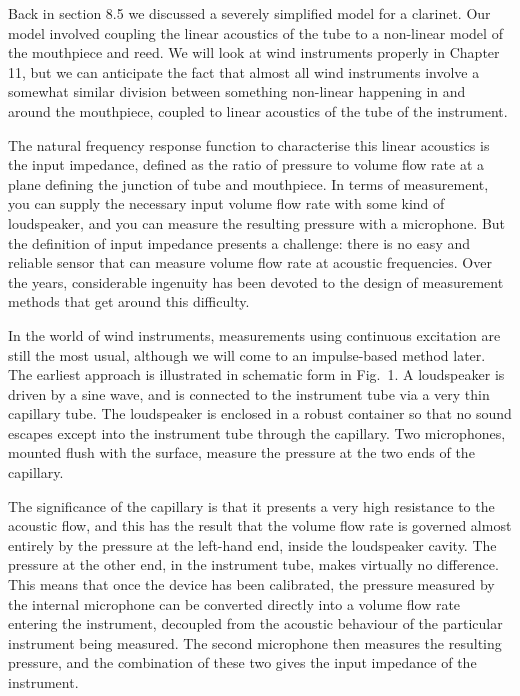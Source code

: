   Back in section 8.5 we discussed a severely simplified model for a clarinet. 
  Our model involved coupling the linear acoustics of the tube to a non-linear 
  model of the mouthpiece and reed. We will look at wind instruments properly 
  in Chapter 11, but we can anticipate the fact that almost all wind 
  instruments involve a somewhat similar division between something non-linear 
  happening in and around the mouthpiece, coupled to linear acoustics of the 
  tube of the instrument. 

  The natural frequency response function to characterise this linear acoustics 
  is the input impedance, defined as the ratio of pressure to volume flow rate 
  at a plane defining the junction of tube and mouthpiece. In terms of 
  measurement, you can supply the necessary input volume flow rate with some 
  kind of loudspeaker, and you can measure the resulting pressure with a 
  microphone. But the definition of input impedance presents a challenge: there 
  is no easy and reliable sensor that can measure volume flow rate at acoustic 
  frequencies. Over the years, considerable ingenuity has been devoted to the 
  design of measurement methods that get around this difficulty. 

  In the world of wind instruments, measurements using continuous excitation 
  are still the most usual, although we will come to an impulse-based method 
  later. The earliest approach is illustrated in schematic form in Fig.\ 1. A 
  loudspeaker is driven by a sine wave, and is connected to the instrument tube 
  via a very thin capillary tube. The loudspeaker is enclosed in a robust 
  container so that no sound escapes except into the instrument tube through 
  the capillary. Two microphones, mounted flush with the surface, measure the 
  pressure at the two ends of the capillary. 

  The significance of the capillary is that it presents a very high resistance 
  to the acoustic flow, and this has the result that the volume flow rate is 
  governed almost entirely by the pressure at the left-hand end, inside the 
  loudspeaker cavity. The pressure at the other end, in the instrument tube, 
  makes virtually no difference. This means that once the device has been 
  calibrated, the pressure measured by the internal microphone can be converted 
  directly into a volume flow rate entering the instrument, decoupled from the 
  acoustic behaviour of the particular instrument being measured. The second 
  microphone then measures the resulting pressure, and the combination of these 
  two gives the input impedance of the instrument. 

